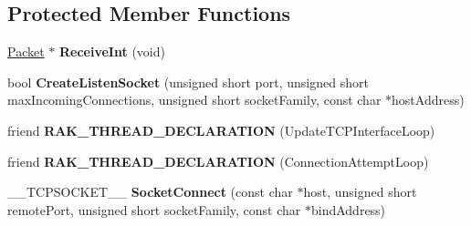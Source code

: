 \subsection*{Protected Member Functions}
\begin{DoxyCompactItemize}
\item 
\hypertarget{class_rak_net_1_1_t_c_p_interface_ae1dc3d384175ad7246bed593392d4e2b}{\hyperlink{struct_rak_net_1_1_packet}{Packet} $\ast$ {\bfseries Receive\-Int} (void)}\label{class_rak_net_1_1_t_c_p_interface_ae1dc3d384175ad7246bed593392d4e2b}

\item 
\hypertarget{class_rak_net_1_1_t_c_p_interface_a1c138756db9c5bf69a6611b5152ba78d}{bool {\bfseries Create\-Listen\-Socket} (unsigned short port, unsigned short max\-Incoming\-Connections, unsigned short socket\-Family, const char $\ast$host\-Address)}\label{class_rak_net_1_1_t_c_p_interface_a1c138756db9c5bf69a6611b5152ba78d}

\item 
\hypertarget{class_rak_net_1_1_t_c_p_interface_ad74728d991472a89eae1e3699954dd3b}{friend {\bfseries R\-A\-K\-\_\-\-T\-H\-R\-E\-A\-D\-\_\-\-D\-E\-C\-L\-A\-R\-A\-T\-I\-O\-N} (Update\-T\-C\-P\-Interface\-Loop)}\label{class_rak_net_1_1_t_c_p_interface_ad74728d991472a89eae1e3699954dd3b}

\item 
\hypertarget{class_rak_net_1_1_t_c_p_interface_a463d705a2038f6234d0a6663b118381d}{friend {\bfseries R\-A\-K\-\_\-\-T\-H\-R\-E\-A\-D\-\_\-\-D\-E\-C\-L\-A\-R\-A\-T\-I\-O\-N} (Connection\-Attempt\-Loop)}\label{class_rak_net_1_1_t_c_p_interface_a463d705a2038f6234d0a6663b118381d}

\item 
\hypertarget{class_rak_net_1_1_t_c_p_interface_a7cd0e4fc2b74edd723fabaa33568b965}{\-\_\-\-\_\-\-T\-C\-P\-S\-O\-C\-K\-E\-T\-\_\-\-\_\- {\bfseries Socket\-Connect} (const char $\ast$host, unsigned short remote\-Port, unsigned short socket\-Family, const char $\ast$bind\-Address)}\label{class_rak_net_1_1_t_c_p_interface_a7cd0e4fc2b74edd723fabaa33568b965}

\end{DoxyCompactItemize}
